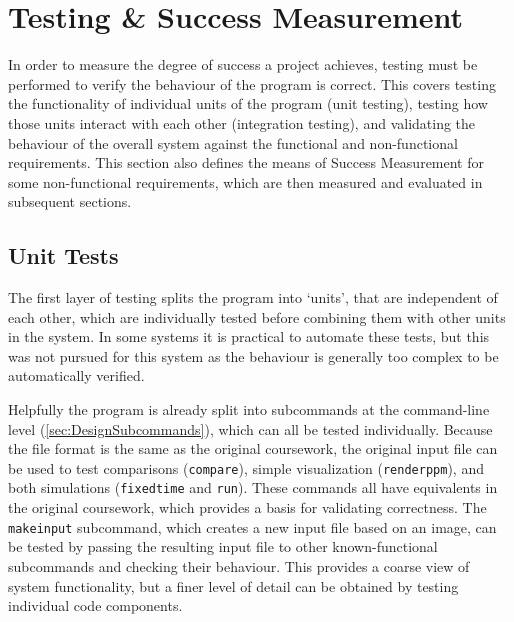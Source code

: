 \chapter{Testing \& Success Measurement}\label{sec:Testing}
In order to measure the degree of success a project achieves, testing must be performed to verify the behaviour of the program is correct.
This covers testing the functionality of individual units of the program (unit testing), testing how those units interact with each other (integration testing), and validating the behaviour of the overall system against the functional and non-functional requirements.
This section also defines the means of Success Measurement for some non-functional requirements, which are then measured and evaluated in subsequent sections.%

\section{Unit Tests}
The first layer of testing splits the program into `units', that are independent of each other, which are individually tested before combining them with other units in the system.
In some systems it is practical to automate these tests, but this was not pursued for this system as the behaviour is generally too complex to be automatically verified.

Helpfully the program is already split into subcommands at the command-line level (\cref{sec:DesignSubcommands}), which can all be tested individually.
Because the file format is the same as the original coursework, the original input file can be used to test comparisons (\texttt{compare}), simple visualization (\texttt{renderppm}), and both simulations (\texttt{fixedtime} and \texttt{run}).
These commands all have equivalents in the original coursework, which provides a basis for validating correctness.
The \texttt{makeinput} subcommand, which creates a new input file based on an image, can be tested by passing the resulting input file to other known-functional subcommands and checking their behaviour.
This provides a coarse view of system functionality, but a finer level of detail can be obtained by testing individual code components.

